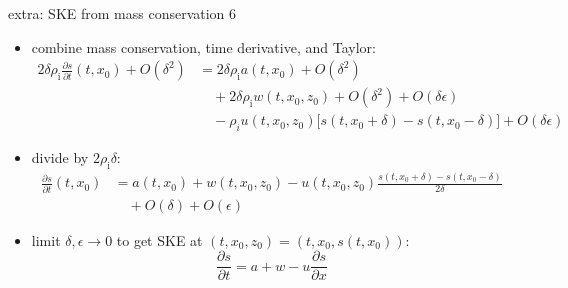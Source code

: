 \documentclass[10pt]{beamer}
\newcommand{\eps}{\epsilon}
\newcommand{\rhoi}{\rho_{\text{i}}}
\begin{document}
\begin{frame}{extra: SKE from mass conservation 6}

\begin{itemize}
\item combine mass conservation, time derivative, and Taylor:
\begin{align*}
2\delta \rhoi \frac{\partial s}{\partial t}(t,x_0) + O(\delta^2) &= 2\delta \rhoi a(t,x_0) + O(\delta^2) \\
  &\quad + 2\delta \rhoi w(t,x_0,z_0) + O(\delta^2) + O(\delta \eps) \\
  &\quad - \rho_i u(t,x_0,z_0) \Big[s(t,x_0+\delta) - s(t,x_0-\delta)\Big] + O(\delta \eps)
\end{align*}
\item divide by $2\rhoi\delta$:
\begin{align*}
\frac{\partial s}{\partial t}(t,x_0) &= a(t,x_0) + w(t,x_0,z_0) - u(t,x_0,z_0) \frac{s(t,x_0+\delta) - s(t,x_0-\delta)}{2\delta} \\
  &\quad  + O(\delta) + O(\eps)
\end{align*}
\item limit $\delta, \eps \to 0$ to get SKE at $(t,x_0,z_0) = (t,x_0,s(t,x_0))$:
  $$\frac{\partial s}{\partial t} = a + w - u \frac{\partial s}{\partial x}$$
\end{itemize}
\end{frame}
\end{document}
